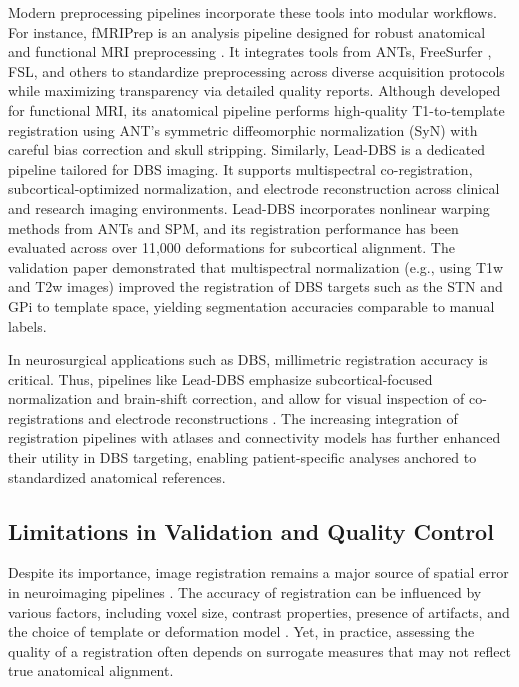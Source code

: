 Modern preprocessing pipelines incorporate these tools into modular workflows. For instance, fMRIPrep is an analysis pipeline designed for robust anatomical and functional MRI preprocessing \cite{Esteban2019-oz}. It integrates tools from ANTs, FreeSurfer \cite{Fischl2012-dp}, FSL, and others to standardize preprocessing across diverse acquisition protocols while maximizing transparency via detailed quality reports. Although developed for functional MRI, its anatomical pipeline performs high-quality T1-to-template registration using ANT's symmetric diffeomorphic normalization (SyN) with careful bias correction and skull stripping. Similarly, Lead-DBS is a dedicated pipeline tailored for DBS imaging. It supports multispectral co-registration, subcortical-optimized normalization, and electrode reconstruction across clinical and research imaging environments. Lead-DBS incorporates nonlinear warping methods from ANTs and SPM, and its registration performance has been evaluated across over 11,000 deformations for subcortical alignment. The validation paper \cite{Ewert2019-cc} demonstrated that multispectral normalization (e.g., using T1w and T2w images) improved the registration of DBS targets such as the STN and GPi to template space, yielding segmentation accuracies comparable to manual labels. 

In neurosurgical applications such as DBS, millimetric registration accuracy is critical. Thus, pipelines like Lead-DBS emphasize subcortical-focused normalization and brain-shift correction, and allow for visual inspection of co-registrations and electrode reconstructions \cite{Neudorfer2023-wd}. The increasing integration of registration pipelines with atlases and connectivity models has further enhanced their utility in DBS targeting, enabling patient-specific analyses anchored to standardized anatomical references.

\subsection{Limitations in Validation and Quality Control}
Despite its importance, image registration remains a major source of spatial error in neuroimaging pipelines \cite{Lau2019-eh, Abbass2022-lf}. The accuracy of registration can be influenced by various factors, including voxel size, contrast properties, presence of artifacts, and the choice of template or deformation model \cite{Klein2009-lv, Ewert2019-cc}. Yet, in practice, assessing the quality of a registration often depends on surrogate measures that may not reflect true anatomical alignment.

